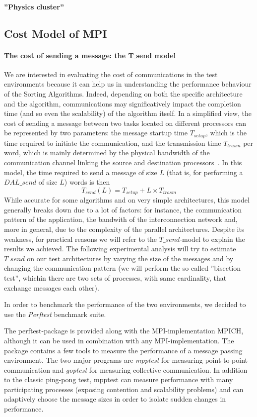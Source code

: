 \paragraph{''Physics cluster''}

\subsection{Cost Model of MPI}
\label{MPI-cost-model}
\paragraph{The cost of sending a message: the T$\_$send model}
We are interested in evaluating the cost of communications in the test environments because it can help us in understanding the performance behaviour of the Sorting Algorithms. Indeed, depending on both the specific architecture and the algorithm, communications may significatively impact the completion time (and so even the scalability) of the algorithm itself. In a simplified view, the cost of sending a message between two tasks located on different processors can be represented by two parameters: the message startup time $T_{setup}$, which is the time required to initiate the communication, and the transmission time $T_{trasm}$ per word, which is mainly determined by the physical bandwidth of the communication channel linking the source and destination processors~\cite{VANN}. In this model, the time required to send a message of size $L$ (that is, for performing a $DAL\_send$ of size $L$) words is then
\[
T_{send}(L) = T_{setup} + L \times T_{trasm}
\]
While accurate for some algorithms and on very simple architectures, this model generally breaks down due to a lot of factors: for instance, the communication pattern of the application, the bandwith of the interconnection network and, more in general, due to the complexity of the parallel architectures. Despite its weakness, for practical reasons we will refer to the $T\_send$-model to explain the results we achieved.  
The following experimental analysis will try to estimate $T\_send$ on our test architectures by varying the size of the messages and by changing the communication pattern (we will perform the so called ''bisection test'', whichin there are two sets of processes, with same cardinality, that exchange messages each other). 

In order to benchmark the performance of the two environments, we decided to use the \textit{Perftest} benchmark suite.

The perftest-package is provided along with the MPI-implementation MPICH, although it can be used in combination with any MPI-implementation. The package contains a few tools to measure the performance of a message passing environment. The two major programs are \textit{mpptest} for measuring point-to-point communication and \textit{goptest} for measuring collective communication. In addition to the classic ping-pong test, mpptest can measure performance with many participating processes (exposing contention and scalability problems) and can adaptively choose the message sizes in order to isolate sudden changes in performance. 

